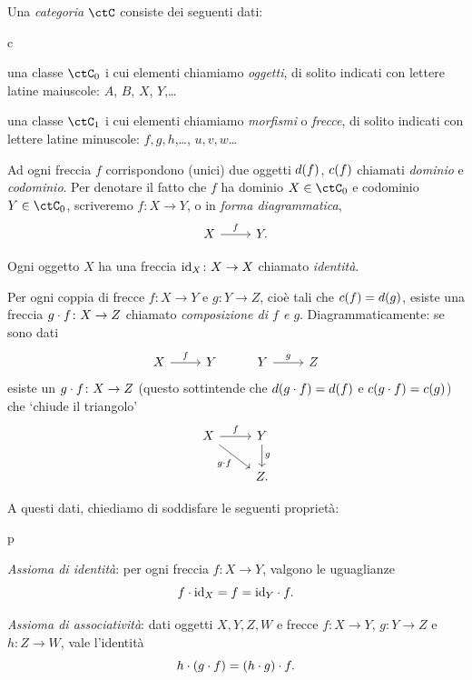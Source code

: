 \begin{definition}[Categoria]\label{def_categ}
 Una \emph{categoria} \(\ctC\) consiste dei seguenti dati:
 \begin{enumtag}{c}
  \item\label{c_1} una classe \(\ctC_0\) i cui elementi chiamiamo \emph{oggetti}, di solito indicati con lettere latine maiuscole: \(A\), \(B\), \(X\), \(Y\),\dots
  \item\label{c_2} una classe \(\ctC_1\) i cui elementi chiamiamo \emph{morfismi} o \emph{frecce}, di solito indicati con lettere latine minuscole: \(f,g,h\),\dots, \(u,v,w\)\dots
  \item\label{c_3} Ad ogni freccia \(f\) corrispondono (unici) due oggetti \(d(f)\), \(c(f)\) chiamati \emph{dominio} e \emph{codominio}. Per denotare il fatto che \(f\) ha dominio \(X\in\ctC_0\) e codominio \(Y\in\ctC_0\), scriveremo \(f\colon X\to Y\), o in \emph{forma diagrammatica},
  \[\begin{tikzcd} X \ar[r, "f"] & Y. \end{tikzcd}\]
  \item\label{c_4} Ogni oggetto \(X\) ha una freccia \(\mathrm{id}_X\colon X\to X\) chiamato \emph{identità}.
  \item\label{c_5} Per ogni coppia di frecce \(f\colon X\to Y\) e \(g\colon Y\to Z\), cioè tali che \(c(f)=d(g)\), esiste una freccia \(g\cdot f\colon X\to Z\) chiamato \emph{composizione di \(f\) e \(g\)}. Diagrammaticamente: se sono dati
  \[
   \begin{tikzcd}
    X \ar{r}{f}
    & Y & Y \ar{r}{g} & Z
   \end{tikzcd}
  \]
  esiste un \(g\cdot f \colon X\to Z\) (questo sottintende che \(d(g\cdot f)=d(f)\) e \(c(g\cdot f)=c(g)\)) che `chiude il triangolo'
  \[\begin{tikzcd}
    X \ar[r, "f"] \ar[dr, "g\cmp f"'] & Y\ar[d, "g"] \\
    & Z.
   \end{tikzcd}\]
 \end{enumtag}
 A questi dati, chiediamo di soddisfare le seguenti proprietà:
 \begin{enumtag}{p}
  \item \label{cp_1} \emph{Assioma di identità}: per ogni freccia \(f\colon X\to Y\), valgono le uguaglianze
  \[f\cdot\mathrm{id}_X=f=\mathrm{id}_Y\cdot f.\]
  \item \label{cp_2} \emph{Assioma di associatività}: dati oggetti \(X,Y,Z,W\) e frecce \(f\colon X\to Y\), \(g\colon Y\to Z\) e \(h\colon Z\to W\), vale l'identità
  \[h\cdot (g\cdot f) = (h\cdot g)\cdot f.\]
 \end{enumtag}
\end{definition}
